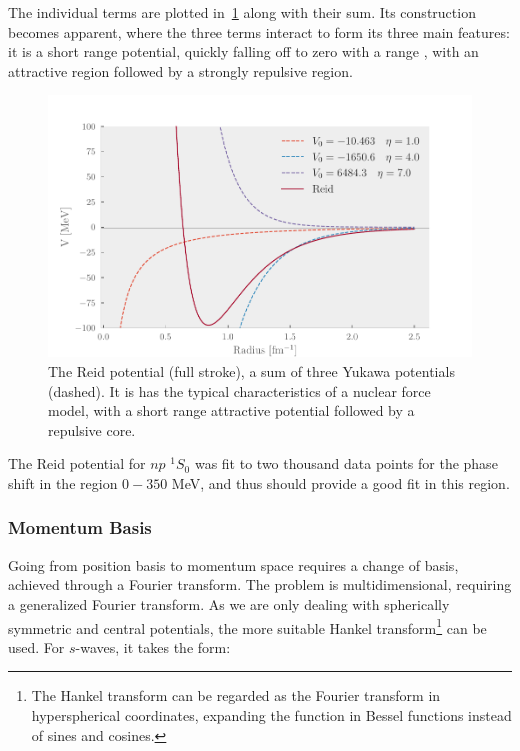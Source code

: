 The individual terms are plotted in~\cref{fig:reid} along with their sum. Its
construction becomes apparent, where the three terms interact to form its three
main features: it is a short range potential, quickly falling off to zero with a
range , with
an attractive region followed by a strongly repulsive region.

\begin{figure}[ht]
  \centering
  \includegraphics[]{Figures/reid.pdf}
  \caption{\label{fig:reid} The Reid potential (full stroke), a sum of three Yukawa potentials
  (dashed). It is has the typical characteristics of a nuclear force model, with
  a short range attractive potential followed by a repulsive core.}
\end{figure}

The Reid potential for \(np\) \(^{1}S_{0}\) was fit to two thousand data points
for the phase shift in the region \(0-350\) MeV, and thus should provide a good
fit in this region.

\subsubsection{Momentum Basis}

Going from position basis to momentum space requires a change of basis, achieved
through a Fourier transform. The problem is multidimensional, requiring a
generalized Fourier transform. As we are only dealing with spherically symmetric
and central potentials, the more suitable Hankel transform\footnote{The Hankel
  transform can be regarded as the Fourier transform in hyperspherical coordinates, expanding the function in
Bessel functions instead of sines and cosines. } can be used. For
\(s\)-waves, it takes the form:

